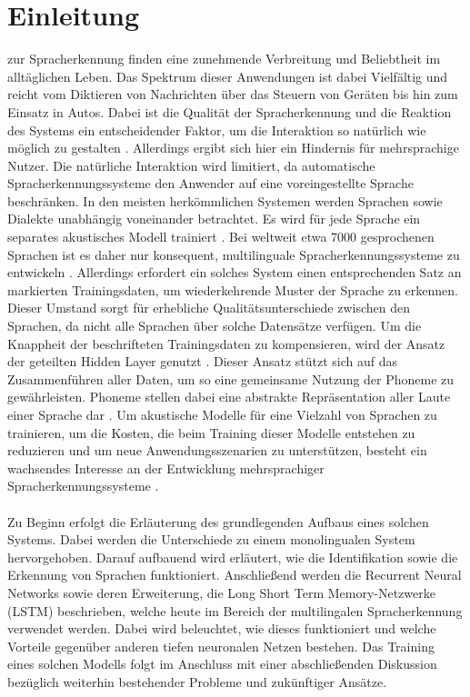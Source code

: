 \section{Einleitung}\label{sec:introduction}
 zur Spracherkennung finden eine zunehmende Verbreitung und Beliebtheit im alltäglichen Leben. Das Spektrum dieser Anwendungen ist dabei Vielfältig und reicht vom Diktieren von Nachrichten über das Steuern von Geräten bis hin zum Einsatz in Autos. Dabei ist die Qualität der Spracherkennung und die Reaktion des Systems ein entscheidender Faktor, um die Interaktion so natürlich wie möglich zu gestalten \cite{Yu.2014}. Allerdings ergibt sich hier ein Hindernis für mehrsprachige Nutzer. Die natürliche Interaktion wird limitiert, da automatische Spracherkennungssysteme den Anwender auf eine voreingestellte Sprache beschränken. In den meisten herkömmlichen Systemen werden Sprachen sowie Dialekte unabhängig voneinander betrachtet. Es wird für jede Sprache ein separates akustisches Modell trainiert \cite{Gonzalez.2015}. Bei weltweit etwa 7000 gesprochenen Sprachen ist es daher nur konsequent, multilinguale Spracherkennungssysteme zu entwickeln \cite{Gary.2018}. Allerdings erfordert ein solches System einen entsprechenden Satz an markierten Trainingsdaten, um wiederkehrende Muster der Sprache zu erkennen. 
Dieser Umstand sorgt für erhebliche Qualitätsunterschiede zwischen den Sprachen, da nicht alle Sprachen über solche Datensätze verfügen. Um die Knappheit der beschrifteten Trainingsdaten zu kompensieren, wird der Ansatz der geteilten Hidden Layer genutzt \cite{Schultz.1998}. Dieser Ansatz stützt sich auf das Zusammenführen aller Daten, um so eine gemeinsame Nutzung der Phoneme zu gewährleisten. Phoneme stellen dabei eine abstrakte Repräsentation aller Laute einer Sprache dar \cite{Zissman.2001}. Um akustische Modelle für eine Vielzahl von Sprachen zu trainieren, um die Kosten, die beim Training dieser Modelle entstehen zu reduzieren und um neue Anwendungsszenarien zu unterstützen, besteht ein wachsendes Interesse an der Entwicklung mehrsprachiger Spracherkennungssysteme \cite{Yu.2014}.
\\\\
Zu Beginn erfolgt die Erläuterung des grundlegenden Aufbaus eines solchen Systems. Dabei werden die Unterschiede zu einem monolingualen System hervorgehoben. Darauf aufbauend wird erläutert, wie die Identifikation sowie die Erkennung von Sprachen funktioniert. Anschließend werden die Recurrent Neural Networks sowie deren Erweiterung, die Long Short Term Memory-Netzwerke (LSTM) beschrieben, welche heute im Bereich der multilingalen Spracherkennung verwendet werden. Dabei wird beleuchtet, wie dieses funktioniert und welche Vorteile gegenüber anderen tiefen neuronalen Netzen bestehen. Das Training eines solchen Modells folgt im Anschluss mit einer abschließenden Diskussion bezüglich weiterhin bestehender Probleme und zukünftiger Ansätze.

